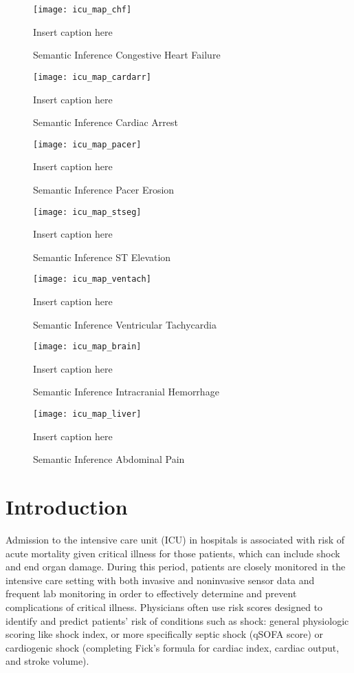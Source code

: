 \begin{figure}
\texttt{[image: icu\_map\_chf]}
\caption{Semantic Inference Congestive Heart Failure}
\vspace{12px}
Insert caption here
\label{fig:icu_map_chf}
\end{figure}

\begin{figure}
\texttt{[image: icu\_map\_cardarr]}
\caption{Semantic Inference Cardiac Arrest}
\vspace{12px}
Insert caption here
\label{fig:icu_map_cardarr}
\end{figure}

\begin{figure}
\texttt{[image: icu\_map\_pacer]}
\caption{Semantic Inference Pacer Erosion}
\vspace{12px}
Insert caption here
\label{fig:icu_map_pacer}
\end{figure}

\begin{figure}
\texttt{[image: icu\_map\_stseg]}
\caption{Semantic Inference ST Elevation}
\vspace{12px}
Insert caption here
\label{fig:icu_map_stseg}
\end{figure}

\begin{figure}
\texttt{[image: icu\_map\_ventach]}
\caption{Semantic Inference Ventricular Tachycardia}
\vspace{12px}
Insert caption here
\label{fig:icu_map_ventach}
\end{figure}

\begin{figure}
\texttt{[image: icu\_map\_brain]}
\caption{Semantic Inference Intracranial Hemorrhage}
\vspace{12px}
Insert caption here
\label{fig:icu_map_brain}
\end{figure}

\begin{figure}
\texttt{[image: icu\_map\_liver]}
\caption{Semantic Inference Abdominal Pain}
\vspace{12px}
Insert caption here
\label{fig:icu_map_liver}
\end{figure}

\section{Introduction}
Admission to the intensive care unit (ICU) in hospitals is associated with risk of acute mortality given critical illness for those patients, which can include shock and end organ damage. During this period, patients are closely monitored in the intensive care setting with both invasive and noninvasive sensor data and frequent lab monitoring in order to effectively determine and prevent complications of critical illness.  Physicians often use risk scores designed to identify and predict patients’ risk of conditions such as shock: general physiologic scoring like shock index, or more specifically septic shock (qSOFA score) or cardiogenic shock (completing Fick’s formula for cardiac index, cardiac output, and stroke volume).

